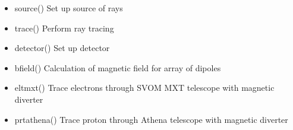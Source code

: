 \documentclass[letterpaper,10pt,english]{sphinxmanual}
\begin{document}
\begin{itemize}
\item {} 
source() Set up source of rays

\item {} 
trace() Perform ray tracing

\item {} 
detector() Set up detector

\end{itemize}

\begin{itemize}
\item {} 
bfield() Calculation of magnetic field for array of dipoles

\item {} 
eltmxt() Trace electrons through SVOM MXT telescope with magnetic diverter

\item {} 
prtathena() Trace proton through Athena telescope with magnetic diverter

\end{itemize}
\label{\detokenize{xsrt_functions:module-xsrt}}
\end{document}
